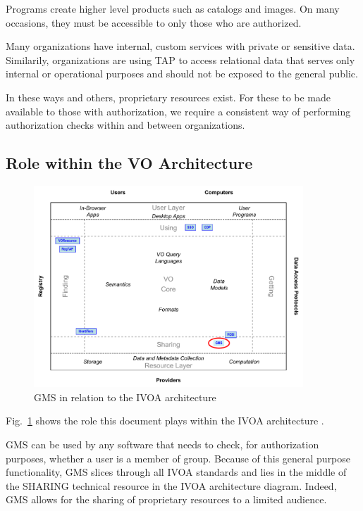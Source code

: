 \documentclass[11pt,a4paper]{ivoa}
\begin{document}
Programs create higher level products such as catalogs and images.  On many occasions, they must be accessible to only those who are authorized.

Many organizations have internal, custom services with private or sensitive data.  Similarily, organizations are using TAP to access relational data that serves only internal or operational purposes and should not be exposed to the general public.

In these ways and others, proprietary resources exist.  For these to be made available to those with authorization, we require a consistent way of performing authorization checks within and between organizations.

\subsection{Role within the VO Architecture}
\label{subsec:roleinarch}

\begin{figure}
\centering

\includegraphics[width=0.9\textwidth]{role_diagram.pdf}
\caption{GMS in relation to the IVOA architecture}
\label{fig:archdiag}
\end{figure}

Fig.~\ref{fig:archdiag} shows the role this document plays within the
IVOA architecture \citep{2010ivoa.rept.1123A}.

GMS can be used by any software that needs to check, for authorization purposes, whether a user is a member of group.  Because of this general purpose functionality, GMS slices through all IVOA standards and lies in the middle of the SHARING technical resource in the IVOA architecture diagram.  Indeed, GMS allows for the sharing of proprietary resources to a limited audience.
\end{document}
